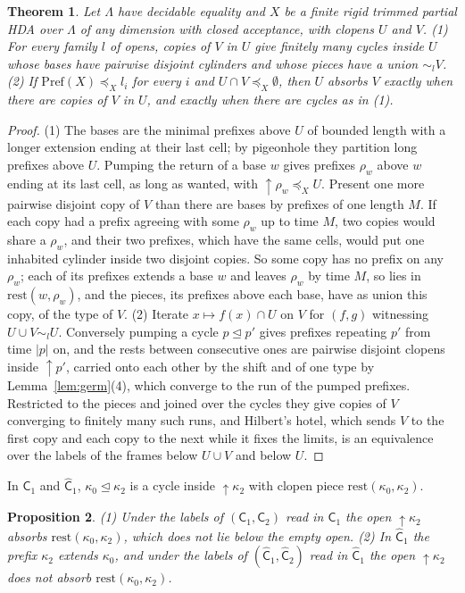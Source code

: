 \documentclass{lmcs}
\newtheorem{theorem}{Theorem}[section]
\newtheorem{proposition}[theorem]{Proposition}
\theoremstyle{definition}
\theoremstyle{remark}
\newcommand{\dimn}[1]{\lvert #1\rvert}
\newcommand{\Pref}{\mathrm{Pref}}
\newcommand{\ext}{\trianglelefteq}
\newcommand{\fle}[1]{\preceq_{#1}}
\newcommand{\upc}[1]{{\uparrow}#1}
\providecommand{\tyl}[1]{\sim_{#1}}
\providecommand{\rest}{\mathrm{rest}}
\providecommand{\wC}[1]{\mathsf{C}_{#1}}
\providecommand{\wCh}[1]{\hat{\mathsf{C}}_{#1}}
\begin{document}
\begin{theorem}\label{thm:absorb}
Let $\Lambda$ have decidable equality and $X$ be a finite rigid trimmed partial HDA over $\Lambda$ of any dimension with
closed acceptance, with clopens $U$ and $V$. (1) For every family $l$ of opens, copies of $V$ in
$U$ give finitely many cycles inside $U$ whose bases have pairwise disjoint cylinders and whose pieces have a union
$\tyl{l}V$. (2) If $\Pref(X)\fle{X}l_i$ for every $i$ and
$U\cap V\fle{X}\emptyset$, then $U$ absorbs $V$ exactly when there are copies of $V$ in $U$, and exactly when there are
cycles as in (1).
\end{theorem}

\begin{proof}
(1) The bases are the minimal prefixes above $U$ of bounded length with a longer extension ending at their last cell;
by pigeonhole they partition long prefixes above $U$. Pumping the return of a base $w$ gives
prefixes $\rho_w$ above $w$ ending at its last cell, as long as wanted, with $\upc{\rho_w}\fle{X}U$. Present one more
pairwise disjoint copy of $V$ than there are bases by prefixes of one length $M$. If each copy had a prefix agreeing with
some $\rho_w$ up to time $M$, two copies would share a $\rho_w$, and their two prefixes, which have the same cells, would
put one inhabited cylinder inside two disjoint copies. So some copy has no prefix on any $\rho_w$; each of its prefixes
extends a base $w$ and leaves $\rho_w$ by time $M$, so lies in $\rest(w,\rho_w)$, and the pieces, its prefixes above
each base, have as union this copy, of the type of $V$.
(2) Iterate $x\mapsto f(x)\cap U$ on $V$ for $(f,g)$
witnessing $U\cup V\tyl{l}U$. Conversely pumping a cycle $p\ext p'$ gives
prefixes repeating $p'$ from time $\dimn{p}$ on, and the rests between consecutive ones are pairwise disjoint clopens
inside $\upc{p'}$, carried onto each other by the shift and of one type by Lemma~\ref{lem:germ}(4), which converge to
the run of the pumped prefixes. Restricted to the pieces and joined over the cycles they
give copies of $V$ converging to finitely many such runs, and Hilbert's hotel, which
sends $V$ to the first copy and each copy to the next while it fixes the limits, is an equivalence over the labels of the
frames below $U\cup V$ and below $U$.
\end{proof}

In $\wC{1}$ and $\wCh{1}$, $\kappa_0\ext\kappa_2$ is a cycle inside $\upc{\kappa_2}$ with clopen piece
$\rest(\kappa_0,\kappa_2)$.

\begin{proposition}\label{prop:flip}
(1) Under the labels of $(\wC{1},\wC{2})$ read in $\wC{1}$ the open $\upc{\kappa_2}$ absorbs $\rest(\kappa_0,\kappa_2)$,
which does not lie below the empty open. (2) In $\wCh{1}$ the prefix $\kappa_2$ extends
$\kappa_0$, and under the labels of $(\wCh{1},\wCh{2})$ read in $\wCh{1}$ the open $\upc{\kappa_2}$ does not absorb
$\rest(\kappa_0,\kappa_2)$.
\end{proposition}
\end{document}
